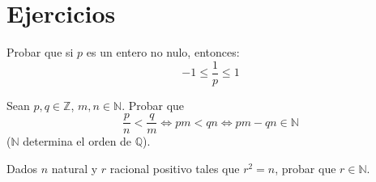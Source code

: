 \section{Ejercicios}
\begin{ejercicio}
    Probar que si $p$ es un entero no nulo, entonces:
    \begin{equation*}
        -1 \leq \frac{1}{p} \leq 1 
    \end{equation*}
\end{ejercicio}

\begin{ejercicio}
    Sean $p,q \in \mathbb{Z}$, $m,n \in \mathbb{N}$. Probar que
    \begin{equation*}
        \frac{p}{n} < \frac{q}{m} \Leftrightarrow pm < qn \Leftrightarrow pm - qn \in \mathbb{N}
    \end{equation*}
    ($\mathbb{N}$ determina el orden de $\mathbb{Q}$).
\end{ejercicio}

\begin{ejercicio}
    Dados $n$ natural y $r$ racional positivo tales que $r^2=n$, probar que $r \in \mathbb{N}$.
\end{ejercicio}